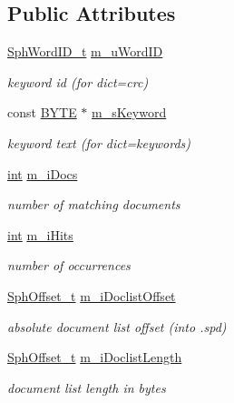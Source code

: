\subsection*{Public Attributes}
\begin{DoxyCompactItemize}
\item 
\hyperlink{sphinx_8h_a80a94d5984fdf9214a98f3e5e65df963}{Sph\-Word\-I\-D\-\_\-t} \hyperlink{structCSphDictEntry_af0ae47ee68f60ba0965b7b9271d2c2c2}{m\-\_\-u\-Word\-I\-D}
\begin{DoxyCompactList}\small\item\em keyword id (for dict=crc) \end{DoxyCompactList}\item 
const \hyperlink{sphinxstd_8h_a4ae1dab0fb4b072a66584546209e7d58}{B\-Y\-T\-E} $\ast$ \hyperlink{structCSphDictEntry_a58f6fbd5ffd37a518e7e792030ed276e}{m\-\_\-s\-Keyword}
\begin{DoxyCompactList}\small\item\em keyword text (for dict=keywords) \end{DoxyCompactList}\item 
\hyperlink{sphinxexpr_8cpp_a4a26e8f9cb8b736e0c4cbf4d16de985e}{int} \hyperlink{structCSphDictEntry_a8a8f91e5c3644e336be6ea3354fac8f8}{m\-\_\-i\-Docs}
\begin{DoxyCompactList}\small\item\em number of matching documents \end{DoxyCompactList}\item 
\hyperlink{sphinxexpr_8cpp_a4a26e8f9cb8b736e0c4cbf4d16de985e}{int} \hyperlink{structCSphDictEntry_a628b204b5451e9c5126068154f3fe6b9}{m\-\_\-i\-Hits}
\begin{DoxyCompactList}\small\item\em number of occurrences \end{DoxyCompactList}\item 
\hyperlink{sphinx_8h_a0fb3b64afebef33c61367714754eaa90}{Sph\-Offset\-\_\-t} \hyperlink{structCSphDictEntry_a3115d67c4bf83b750e7d84be6f919a10}{m\-\_\-i\-Doclist\-Offset}
\begin{DoxyCompactList}\small\item\em absolute document list offset (into .spd) \end{DoxyCompactList}\item 
\hyperlink{sphinx_8h_a0fb3b64afebef33c61367714754eaa90}{Sph\-Offset\-\_\-t} \hyperlink{structCSphDictEntry_ae6fd52be73564ec837615af17d29c0ac}{m\-\_\-i\-Doclist\-Length}
\begin{DoxyCompactList}\small\item\em document list length in bytes \end{DoxyCompactList}\item 

\end{DoxyCompactItemize}

